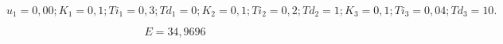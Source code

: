 

%     



%     



\begin{figure}[H]
    \centering
    
    \caption{$u_1 = 0,00; K_1 = 0,1; Ti_1 = 0,3; Td_1 = 0; K_2 = 0,1; Ti_2 = 0,2; Td_2 = 1; K_3 = 0,1; Ti_3 = 0,04; Td_3 = 10.$}
\end{figure}

\begin{equation}
    E = 34,9696
\end{equation}


%     

